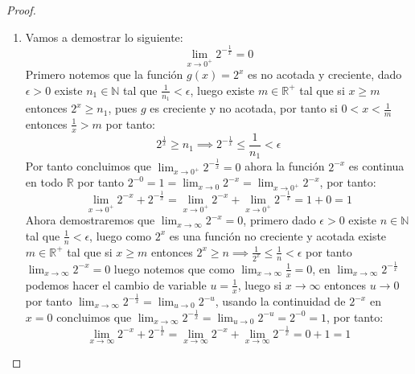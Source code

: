 \documentclass[11pt,letterpaper]{article}
\newcommand{\R}{\mathbb{R}}
\newcommand{\N}{\mathbb{N}}
\begin{document}
\begin{proof}
    \begin{enumerate}
        \item Vamos a demostrar lo siguiente:
        \begin{equation*}
            \lim_{x\to 0^{+}}2^{-\frac{1}{x}}=0
        \end{equation*}
        Primero notemos que la funci\'on $g(x)=2^x$ es no acotada y creciente, dado $\epsilon>0$ existe $n_1\in \N$ tal que $\frac{1}{n_1}<\epsilon$, luego existe $m\in \R^{+}$ tal que si $x\geq m$ entonces $2^x\geq n_1$, pues $g$ es creciente y no acotada, por tanto si $0<x<\frac{1}{m}$ entonces $\frac{1}{x}>m$ por tanto:\,\\
        \begin{equation*}
            2^{\frac{1}{x}}\geq n_1\implies 2^{-\frac{1}{x}}\leq \frac{1}{n_1}<\epsilon
        \end{equation*}
        Por tanto concluimos que $\displaystyle \lim_{x\to 0^{+}}2^{-\frac{1}{x}}=0$
        ahora la funci\'on $2^{-x}$ es continua en todo $\R$ por tanto $2^{-0}=1=\displaystyle \lim_{x\to 0}2^{-x}=\displaystyle \lim_{x\to 0^{+}}2^{-x}$, por tanto:\,\\
        \begin{equation*}
            \displaystyle \lim_{x\to0^{+}}2^{-x}+2^{-\frac{1}{x}}=\displaystyle \lim_{x\to 0^{+}}2^{-x}+\displaystyle \lim_{x\to0^{+}}2^{-\frac{1}{x}}=1+0=1
        \end{equation*}
        Ahora demostraremos que $\displaystyle \lim_{x\to \infty}2^{-x}=0$, primero dado $\epsilon>0$ existe $n\in\N$ tal que $\frac{1}{n}<\epsilon$, luego como $2^x$ es una funci\'on no creciente y acotada existe $m\in \R^{+}$ tal que si $x\geq m$ entonces $2^x\geq n\implies \frac{1}{2^x}\leq \frac{1}{n}<\epsilon$ por tanto $\displaystyle \lim_{x\to \infty}2^{-x}=0$
        luego notemos que como $\displaystyle\lim_{x\to \infty}\frac{1}{x}=0$, en $\displaystyle\lim_{x \to \infty}2^{-\frac{1}{x}}$ podemos hacer el cambio de variable $u=\frac{1}{x}$, luego si $x\to \infty$ entonces $u\to 0$ por tanto $\displaystyle\lim_{x \to \infty}2^{-\frac{1}{x}}=\displaystyle \lim_{u\to 0}2^{-u}$, usando la continuidad de $2^{-x}$ en $x=0$ concluimos que $\displaystyle\lim_{x \to \infty}2^{-\frac{1}{x}}=\displaystyle \lim_{u\to 0}2^{-u}=2^{-0}=1$, 
        por tanto:\,\\
        \begin{equation*}
            \displaystyle\lim_{x\to \infty}2^{-x}+2^{-\frac{1}{x}}=\displaystyle \lim_{x\to \infty}2^{-x}+\displaystyle \lim_{x\to\infty}2^{-\frac{1}{x}}=0+1=1

\end{equation*}
\end{enumerate}
\end{proof}
\end{document}
